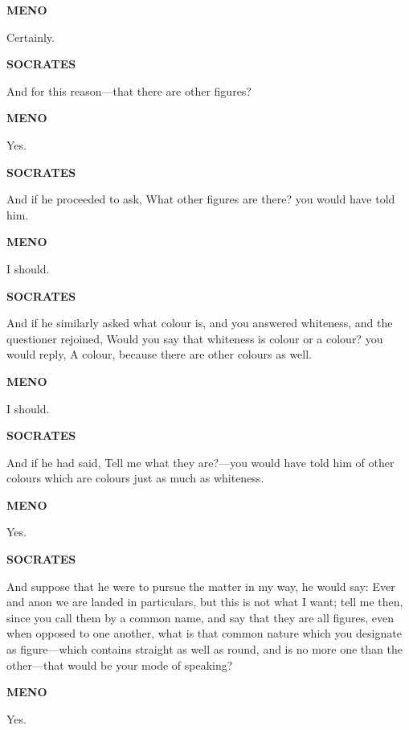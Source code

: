 \documentclass[11pt,letter]{article}
\begin{document}
\par \textbf{MENO}
\par   Certainly.

\par \textbf{SOCRATES}
\par   And for this reason—that there are other figures?

\par \textbf{MENO}
\par   Yes.

\par \textbf{SOCRATES}
\par   And if he proceeded to ask, What other figures are there? you would have told him.

\par \textbf{MENO}
\par   I should.

\par \textbf{SOCRATES}
\par   And if he similarly asked what colour is, and you answered whiteness, and the questioner rejoined, Would you say that whiteness is colour or a colour? you would reply, A colour, because there are other colours as well.

\par \textbf{MENO}
\par   I should.

\par \textbf{SOCRATES}
\par   And if he had said, Tell me what they are?—you would have told him of other colours which are colours just as much as whiteness.

\par \textbf{MENO}
\par   Yes.

\par \textbf{SOCRATES}
\par   And suppose that he were to pursue the matter in my way, he would say:  Ever and anon we are landed in particulars, but this is not what I want; tell me then, since you call them by a common name, and say that they are all figures, even when opposed to one another, what is that common nature which you designate as figure—which contains straight as well as round, and is no more one than the other—that would be your mode of speaking?

\par \textbf{MENO}
\par   Yes.
\end{document}

